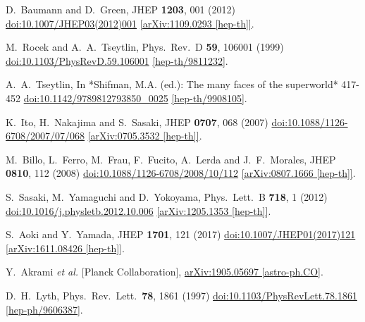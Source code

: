 \documentclass[11pt]{article}
\begin{document}
\begin{thebibliography}{99}
  D.~Baumann and D.~Green,
  JHEP {\bf 1203}, 001 (2012)
  \href{https://dx.doi.org/10.1007/JHEP03(2012)001}{doi:10.1007/JHEP03(2012)001}
  \href{https://arxiv.org/abs/1109.0293}{[arXiv:1109.0293 [hep-th]]}.

  M.~Rocek and A.~A.~Tseytlin,
  Phys.\ Rev.\ D {\bf 59}, 106001 (1999)
  \href{https://dx.doi.org/10.1103/PhysRevD.59.106001}{doi:10.1103/PhysRevD.59.106001}
  \href{https://arxiv.org/abs/hep-th/9811232}{[hep-th/9811232]}.

  A.~A.~Tseytlin,
  In *Shifman, M.A. (ed.): The many faces of the superworld* 417-452
  \href{https://dx.doi.org/10.1142/9789812793850\_0025}{doi:10.1142/9789812793850\_0025}
  \href{https://arxiv.org/abs/hep-th/9908105}{[hep-th/9908105]}.

  K.~Ito, H.~Nakajima and S.~Sasaki,
  JHEP {\bf 0707}, 068 (2007)
  \href{https://dx.doi.org/10.1088/1126-6708/2007/07/068}{doi:10.1088/1126-6708/2007/07/068}
  \href{https://arxiv.org/abs/0705.3532}{[arXiv:0705.3532 [hep-th]]}.

  M.~Billo, L.~Ferro, M.~Frau, F.~Fucito, A.~Lerda and J.~F.~Morales,
  JHEP {\bf 0810}, 112 (2008)
  \href{https://dx.doi.org/10.1088/1126-6708/2008/10/112}{doi:10.1088/1126-6708/2008/10/112}
  \href{https://arxiv.org/abs/0807.1666}{[arXiv:0807.1666 [hep-th]]}.

  S.~Sasaki, M.~Yamaguchi and D.~Yokoyama,
  Phys.\ Lett.\ B {\bf 718}, 1 (2012)
  \href{https://dx.doi.org/10.1016/j.physletb.2012.10.006}{doi:10.1016/j.physletb.2012.10.006}
  \href{https://arxiv.org/abs/1205.1353}{[arXiv:1205.1353 [hep-th]]}.

  S.~Aoki and Y.~Yamada,
  JHEP {\bf 1701}, 121 (2017)
  \href{https://dx.doi.org/10.1007/JHEP01(2017)121}{doi:10.1007/JHEP01(2017)121}
  \href{https://arxiv.org/abs/1611.08426}{[arXiv:1611.08426 [hep-th]]}.

  Y.~Akrami {\it et al.} [Planck Collaboration],
  \href{https://arxiv.org/abs/1905.05697}{arXiv:1905.05697 [astro-ph.CO]}.

  D.~H.~Lyth,
  Phys.\ Rev.\ Lett.\  {\bf 78}, 1861 (1997)
  \href{https://dx.doi.org/10.1103/PhysRevLett.78.1861}{doi:10.1103/PhysRevLett.78.1861}
  \href{https://arxiv.org/abs/hep-ph/9606387}{[hep-ph/9606387]}.

\end{thebibliography}
\end{document}

